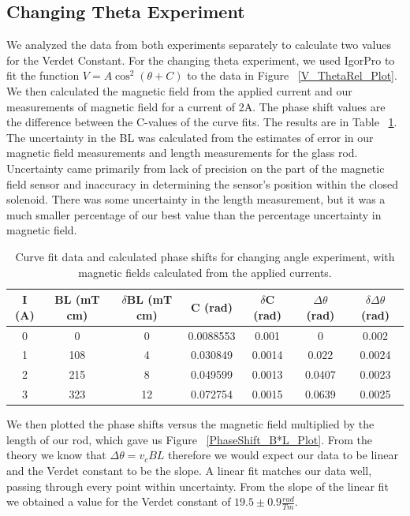 \documentclass[prb,preprint]{revtex4-1}
\begin{document}
\subsection{Changing Theta Experiment}
We analyzed the data from both experiments separately to calculate two values for the Verdet Constant.  For the changing theta experiment, we used IgorPro to fit the function $V = A \cos ^2 (\theta + C)$ to the data in Figure ~\ref{V_ThetaRel_Plot}.  We then calculated the magnetic field from the applied current and our measurements of magnetic field for a current of 2A. The phase shift values are the difference between the C-values of the curve fits.  The results are in Table ~\ref{B*L_PhaseShift_Table}.  The uncertainty in the BL was calculated from the estimates of error in our magnetic field measurements and length measurements for the glass rod. Uncertainty came primarily from lack of precision on the part of the magnetic field sensor and inaccuracy in determining the sensor's position within the closed solenoid. There was some uncertainty in the length measurement, but it was a much smaller percentage of our best value than the percentage uncertainty in magnetic field.
\
\begin{table}[h!]
\centering
\caption{Curve fit data and calculated phase shifts for changing angle experiment, with magnetic fields calculated from the applied currents.}
\begin{ruledtabular}
\begin{tabular}{c c c c c c c}
I (A) & BL (mT cm) & $\delta$BL (mT cm) & C (rad)& $\delta$C (rad) & $\Delta \theta$ (rad) & $\delta \Delta \theta$ (rad)\\
\hline	%
0 &  0  & 0 &  0.0088553 & 0.001 & 0 & 0.002    \\
1 & 108 & 4  & 0.030849  & 0.0014 & 0.022  & 0.0024 \\
2 & 215 & 8 & 0.049599  & 0.0013 & 0.0407 & 0.0023  \\
3 & 323 & 12 & 0.072754  & 0.0015 & 0.0639 & 0.0025 
\end{tabular}
\end{ruledtabular}
\label{B*L_PhaseShift_Table}
\end{table}


We then plotted the phase shifts versus the magnetic field multiplied by the length of our rod, which gave us Figure ~\ref{PhaseShift_B*L_Plot}. From the theory we know that $\Delta \theta = v_c B L$ therefore we would expect our data to be linear and the Verdet constant to be the slope.  A linear fit matches our data well, passing through every point within uncertainty. From the slope of the linear fit we obtained a value for the Verdet constant of $19.5 \pm0.9 \frac{rad}{Tm}$.
\end{document}
